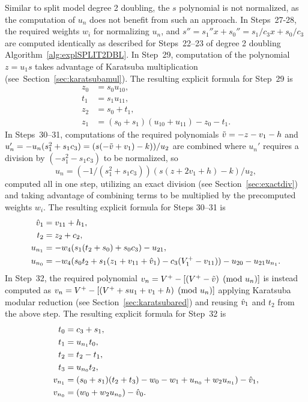 Similar to split model degree 2 doubling, the $s$ polynomial is not normalized,
as the computation of $u_n$ does not benefit from such an approach. In Steps~27-28,
the required weights $w_i$ for normalizing $u_n$, and $s'' = s_1''x + s_0'' =
s_1/c_3x + s_0/c_3$ are computed identically as described for Steps~22--23 of
degree 2 doubling Algorithm~\ref{alg:explSPLIT2DBL}. In Step~29, computation of
the polynomial $z = u_1s$ takes advantage of Karatsuba multiplication
(see~Section~\ref{sec:karatsubamul}). The resulting explicit formula for Step~29
is
\begin{align*}
    z_0 &= s_0u_{10},\\
    t_1 &= s_1u_{11},\\
    z_2 &= s_0 + t_1,\\
    z_1 &= (s_0 + s_1)(u_{10} + u_{11}) - z_0 - t_1.
\end{align*}
In Steps~30--31, computations of the required polynomials $\tilde{v} = -z - v_1 - h$ and
$u_n' = -u_n(s_1^2 + s_1c_3) = (s(-\tilde{v} + v_1) - k))/u_2$ are combined where
$u_n'$ requires a division by $(-s_1^2 - s_1c_3)$ to be normalized, so 
$$ u_n = (-1/(s_1^2 + s_1c_3))(s(z + 2v_1 + h) - k)/u_2,$$ computed all in one step,
utilizing an exact division (see Section~\ref{sec:exactdiv}) and
taking advantage of combining terms to be multiplied by the
precomputed weights $w_i$. The resulting explicit formula for Steps 30--31 is 
\begin{align*}
    \hat{v}_1   &= v_{11} + h_1,\\
    t_2     &= z_2 + c_2,\\
    u_{n_1} &= -w_4(s_1(t_2 + s_0) + s_0c_3) - u_{21},\\
    u_{n_0} &= -w_4(s_0t_2 + s_1(z_1 + v_{11} + \hat{v}_1) - c_3(V^{+}_1 - v_{11})) - u_{20} - u_{21}u_{n_1}.
\end{align*}
In Step~32, the  required polynomial $v_n = V^{+} - [(V^{+} - \tilde{v}) \pmod{u_n}]$ is
instead computed as $v_n = V^{+} - [(V^{+} + su_1 + v_1 + h) \pmod{u_n}]$ applying
Karatsuba modular reduction (see Section~\ref{sec:karatsubared}) and reusing
$\hat{v}_1$ and $t_2$ from the above step. The resulting explicit formula for Step~32 is 
\begin{align*} 
    t_0 &= c_3 + s_1,\\
    t_1 &= u_{n_1}t_0,\\ 
    t_2 &= t_2 - t_1, \\
    t_3 &= u_{n_0}t_2,\\
    v_{n_1} &= (s_0 + s_1)(t_2 + t_3) - w_0 - w_1 + u_{n_0} + w_2u_{n_1}) - \hat{v}_1,\\
    v_{n_0} &= (w_0 + w_2u_{n_0}) - \hat{v}_0.
\end{align*}


